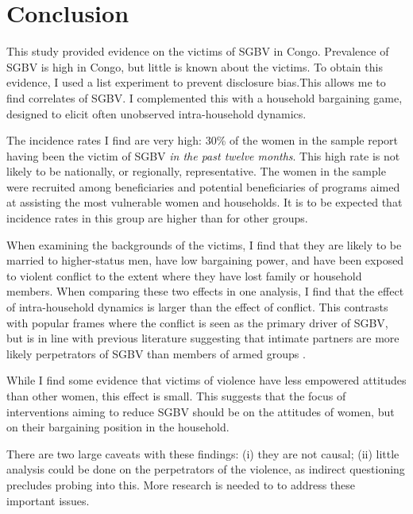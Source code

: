 \documentclass[10pt,a4paper]{scrartcl} %
\begin{document}
\section*{Conclusion}
This study provided evidence on the victims of SGBV in Congo. Prevalence of SGBV is high in Congo, but little is known about the victims. To obtain this evidence, I used a list experiment to prevent disclosure bias.This allows me to find correlates of SGBV. I complemented this with a household bargaining game, designed to elicit often unobserved intra-household dynamics.

The incidence rates I find are very high: 30\% of the women in the sample report having been the victim of SGBV \textit{in the past twelve months}. This high rate is not likely to be nationally, or regionally, representative. The women in the sample were recruited among beneficiaries and potential beneficiaries of programs aimed at assisting the most vulnerable women and households. It is to be expected that incidence rates in this group are higher than for other groups.

When examining the backgrounds of the victims, I find that they are likely to be married to higher-status men, have low bargaining power, and have been exposed to violent conflict to the extent where they have lost family or household members. When comparing these two effects in one analysis, I find that the effect of intra-household dynamics is larger than the effect of conflict. This contrasts with popular frames where the conflict is seen as the primary driver of SGBV, but is in line with previous literature suggesting that intimate partners are more likely perpetrators of SGBV than members of armed groups \citep[see e.g.][]{Peterman2011}. 

While I find some evidence that victims of violence have less empowered attitudes than other women, this effect is small. This suggests that the focus of interventions aiming to reduce SGBV should be on the attitudes of women, but on their bargaining position in the household.

There are two large caveats with these findings: (i) they are not causal; (ii) little analysis could be done on the perpetrators of the violence, as indirect questioning precludes probing into this. More research is needed to  to address these important issues.


\clearpage 


\end{document}
